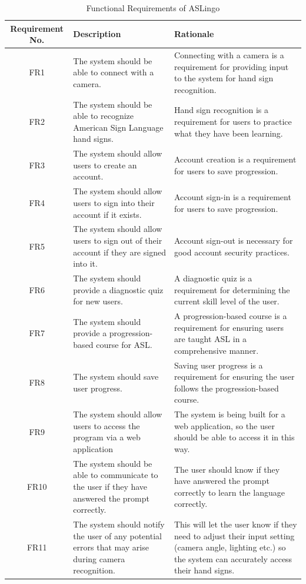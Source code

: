 \documentclass[12pt, titlepage]{article}
\begin{document}
\begin{longtable}{| c | p{4cm}| p{6cm}|}
    \caption{Functional Requirements of ASLingo} \\
    \hline
    \textbf{Requirement No.} & \textbf{Description} &\textbf{Rationale}\\
    \hline
    FR1 & The system should be able to connect with a camera. & Connecting with a camera is a requirement for providing input to the system for hand sign recognition. \\
    \hline
    FR2 & The system should be able to recognize American Sign Language hand signs. & Hand sign recognition is a requirement for users to practice what they have been learning. \\
    \hline
    FR3 & The system should allow users to create an account. & Account creation is a requirement for users to save progression. \\
    \hline
    FR4 & The system should allow users to sign into their account if it exists. & Account sign-in is a requirement for users to save progression. \\
    \hline
    FR5 & The system should allow users to sign out of their account if they are signed into it. & Account sign-out is necessary for good account security practices. \\
    \hline
    FR6 & The system should provide a diagnostic quiz for new users. & A diagnostic quiz is a requirement for determining the current skill level of the user. \\
    \hline
    FR7 & The system should provide a progression-based course for ASL. & A progression-based course is a requirement for ensuring users are taught ASL in a comprehensive manner. \\
    \hline
    FR8 & The system should save user progress. & Saving user progress is a requirement for ensuring the user follows the progression-based course. \\
    \hline
    FR9 & The system should allow users to access the program via a web application & The system is being built for a web application, so the user should be able to access it in this way. \\
    \hline
    FR10 & The system should be able to communicate to the user if they have answered the prompt correctly. & The user should know if they have answered the prompt correctly to learn the language correctly. \\ 
    \hline
    FR11 & The system should notify the user of any potential errors that may arise during camera recognition. & This will let the user know if they need to adjust their input setting (camera angle, lighting etc.) so the system can accurately access their hand signs. \\

\end{longtable}
\end{document}
